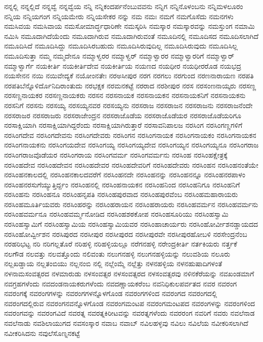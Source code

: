 {ನನ್ನಲ್ಲಿ
ನನ್ನಲ್ಲಿದೆ
ನನ್ನವ್ವೆ
ನನ್ನವ್ವೆಯ
ನನ್ನಿ
ನನ್ನಿಕಂದರ್ಪನೆಂಬುವವನು
ನನ್ನಿಗ
ನನ್ನಿನೊಳಂಬನು
ನನ್ನಿಮಳಲೂರಂ
ನನ್ನಿಯ
ನನ್ನಿಯಗಂಗ
ನನ್ನಿಯಮೇರು
ನನ್ನಿಯಸೇಕರ
ನನ್ನು
ನಮ
ನಮಃ
ನಮಗೆ
ನಮಗೊಸೆದು
ನಮನಗಳು
ನಮಸಿವಯ
ನಮಸಿವಾಯ
ನಮಸೋಮಾರ್ದ್ಧಧಾರಿಣೇ
ನಮಸ್ಕರಿಸಿ
ನಮಸ್ಕಾರ
ನಮಸ್ಕಾರವನ್ನು
ನಮಸ್ತುಂಗ
ನಮಾಮಿ
ನಮಿಸಿ
ನಮೂದಾಗಿದೆಯೆಂದು
ನಮೂದಾಗಿರುವ
ನಮೂದಾಗಿರುವಂತೆ
ನಮೂದಿನಲ್ಲಿ
ನಮೂದಿಸದ
ನಮೂದಿಸಲಾಗಿದೆ
ನಮೂದಿಸಿದೆ
ನಮೂದಿಸಿದ್ದು
ನಮೂದಿಸಿರಬಹುದು
ನಮೂದಿಸಿರುವುದಿಲ್ಲ
ನಮೂದಿಸಿರುವುದು
ನಮೂದಿಸಿಲ್ಲ
ನಮೂದಿಸುತ್ತಾ
ನಮ್ಮ
ನಮ್ಮದೇನೂ
ನಮ್ಮಾಳ್ವರರ
ನಮ್ಮಾಳ್ವರ್
ನಮ್ಮಾಳ್ವಾರರ
ನಮ್ಮಾಳ್ವಾರರಿಗೆ
ನಮ್ಮಾಳ್ವಾರ್
ನಮ್ಮಾಳ್ವಾರ್ಗೆ
ನಯಕೀರ್ತಿ
ನಯಕೀರ್ತಿದೇವ
ನಯಕೀರ್ತಿಯ
ನಯಣದ
ನಯಧೀರ
ನಯಧೀರರೊಡ
ನಯಭದ್ರ
ನಯಸೇನನ
ನಯಿ
ನಯಿವೇದ್ಯಕೆ
ನಯೋಂನತೇಃ
ನರಅಸೀಪುರ
ನರಗ
ನರಗಲು
ನರಗುಂದ
ನರಣನಾರಾಯಣ
ನರಪತಿ
ನರಪತಿಬೆನ್ನೊಳಿರ್ದೊನಿದಿರಾಂತುದು
ನರಭಕ್ಷಕ
ನರಮನಕಟ್ಟೆ
ನರರಾದ
ನರಶೀಪುರ
ನರಸ
ನರಸಂಣನಾಯ್ಕರು
ನರಸಣ್ಣ
ನರಸಣ್ಣನಾಯಕರ
ನರಸಣ್ಣನಾಯಕರು
ನರಸನ
ನರಸನಾಯಕ
ನರಸನಾಯಕನ
ನರಸನಾಯಕನಿಗೆ
ನರಸನಾಯಕನು
ನರಸನಿಗೆ
ನರಸನು
ನರಸಯ್ಯ
ನರಸಯ್ಯನವರ
ನರಸಯ್ಯನು
ನರಸರಾಜ
ನರಸರಾಜನ
ನರಸರಾಜನು
ನರಸರಾಜನೆಂದೇ
ನರಸರಾಜರ
ನರಸರಾಜರು
ನರಸರಾಜೇಂದ್ರನ
ನರಸರಾಜೊಡೆಯ
ನರಸರಾಜೊಡೆಯರ
ನರಸರಾಜೊಡೆಯರಿಗೂ
ನರಸಾಕ್ಷಿಯಾಗಿ
ನರಸಾಕ್ಷಿಯಾಗಿದ್ದರೆಂದು
ನರಸಾಕ್ಷಿಯಾಗಿರುತ್ತಾರೆ
ನರಸಾವನಿಪಾಲಜ
ನರಸಿಂಗ
ನರಸಿಂಗಣ್ಣಗಳಿಗೆ
ನರಸಿಂಗದೇವ
ನರಸಿಂಗದೇವನು
ನರಸಿಂಗದೇವರು
ನರಸಿಂಗನ
ನರಸಿಂಗನಾಯಕ
ನರಸಿಂಗನಾಯಕಂ
ನರಸಿಂಗನಾಯಕನ
ನರಸಿಂಗನಾಯಕನು
ನರಸಿಂಗಯದೇವ
ನರಸಿಂಗಯ್ಯ
ನರಸಿಂಗಯ್ಯದೇವ
ನರಸಿಂಗಯ್ಯನ
ನರಸಿಂಗಯ್ಯನೂ
ನರಸಿಂಗರಾಜ
ನರಸಿಂಗರಾಜವೊಡೆಯರ
ನರಸಿಂಗರಾಯ
ನರಸಿಂಗವರ್ಮ
ನರಸಿಂಗವರ್ಮನು
ನರಸಿಂಹ
ನರಸಿಂಹಕ್ಷೇತ್ರಕ್ಕೆ
ನರಸಿಂಹದೇವ
ನರಸಿಂಹದೇವನ
ನರಸಿಂಹದೇವರ
ನರಸಿಂಹದೇವರಿಗೆ
ನರಸಿಂಹದೇವರು
ನರಸಿಂಹನ
ನರಸಿಂಹನಂತೆಯೇ
ನರಸಿಂಹನಕಾಲದಲ್ಲಿ
ನರಸಿಂಹನಕಾಲದವರೆಗೆ
ನರಸಿಂಹನದೇ
ನರಸಿಂಹನನ್ನು
ನರಸಿಂಹನನ್ನೂ
ನರಸಿಂಹನರಪಾಳಂ
ನರಸಿಂಹನರಸುಗೆಯ್ಯುತ್ತಿರ್ದ್ದಂ
ನರಸಿಂಹನಲ್ಲಿ
ನರಸಿಂಹನಾಯಕನ
ನರಸಿಂಹನಿಂದ
ನರಸಿಂಹನಿಗೂ
ನರಸಿಂಹನಿಗೆ
ನರಸಿಂಹನು
ನರಸಿಂಹನೂ
ನರಸಿಂಹನೃಪತಿ
ನರಸಿಂಹಪುರವಾದ
ನರಸಿಂಹಪುರವೆಂಬ
ನರಸಿಂಹಮಹಾರಾಯರು
ನರಸಿಂಹಮೂರ್ತಿಯವರು
ನರಸಿಂಹರನ್ನು
ನರಸಿಂಹರಾಯನ
ನರಸಿಂಹರಾಯರು
ನರಸಿಂಹವರ್ಮನ
ನರಸಿಂಹವರ್ಮನು
ನರಸಿಂಹವರ್ಮನೂ
ನರಸಿಂಹವರ್ಮ್ಮನೋಡಿದ
ನರಸಿಂಹಶಠಕೋಪ
ನರಸಿಂಹಸೂರಿಯು
ನರಸಿಂಹಸ್ವಾಮಿ
ನರಸಿಂಹಸ್ವಾಮಿಗೆ
ನರಸಿಂಹಸ್ವಾಮಿಯ
ನರಸಿಂಹಸ್ವಾಮಿಯವರ
ನರಸಿಂಹಾಚಾರ್ಯರು
ನರಸಿಂಹೋರ್ವೀಶನಡ್ಡಾಯದದ
ನರಸಿಂಹೋರ್ವ್ವೀಶನ
ನರಸಿಪುರದ
ನರಸೀಪುರ
ನರಸೀಪುರದ
ನರಸೀಪುರವೇ
ನರಸೀಪುರಹೋಬಳಿ
ನರಸೇಂದ್ರನೆಂಬ
ನರಹರಿಭಟ್ಟ
ನರಿ
ನರಿಗಲ್ಲತೊರೆ
ನರಿಹಳ್ಳಿ
ನರಿಹಳ್ಳಿಯಲ್ಲೂ
ನರೆಗನಹಳ್ಳಿ
ನರೇಂದ್ರಕೀರ್ತಿ
ನರ್ತಕಿಯರು
ನರ್ತ್ತಕೆ
ನಲಗೌಡ
ನಲವತ್ತು
ನಲವತ್ತೊಂದು
ನಲಿವಂತು
ನಲುಗನಹಳ್ಳಿ
ನಲುಗನಹಳ್ಳಿಯನ್ನು
ನಲುವಶಿಯ
ನಲೂರು
ನಲ್ಲಖಡ್ಡಾಯ
ನಲ್ಲತಂಬಿಯು
ನಲ್ಲನಂಬಿ
ನಲ್ಲಿ
ನಲ್ಲೆಂಮ್ಮೆ
ನಲ್ಲೆತ್ತು
ನಳನಹಳ್ಳಿಯ
ನಳನಹುಷಾದಿಗಳಂತೆ
ನಳನಾಮಸಂವತ್ಸರದ
ನಳಮಾರುಡು
ನಳಸಂವತ್ಸರ
ನಳಸಂವತ್ಸರದ
ನಳಸಂವತ್ಸರವು
ನಳಿನಕೆರೆಯನ್ನು
ನವಖಂಡಮಾಗೆ
ನವಗ್ರಹಗಳೆಂದು
ನವದಂಡನಾಯಕರುಗಳೆಂದು
ನವದಣ್ಣಾಯಕರೆಂಬ
ನವನಿಧಿಕುಲಪರ್ವತದ
ನವರ
ನವರಂಗ
ನವರಂಗಕ್ಕೆ
ನವರಂಗಗಳನ್ನು
ನವರಂಗಗಳನ್ನೊಳಗೊಂಡ
ನವರಂಗಗಳಿಂದ
ನವರಂಗದ
ನವರಂಗದಲ್ಲಿ
ನವರಂಗದಲ್ಲಿರುವ
ನವರಂಗನವನ್ನೊಳಗೊಂಡ
ನವರಂಗಮಂಟಪ
ನವರಂಗಮಂಟಪದ
ನವರಂಗಳನ್ನು
ನವರಂಗಳಿಂದ
ನವರಂಗವನ್ನು
ನವರಂಗವಿದೆ
ನವರತ್ನ
ನವರತ್ನಕಿರೀಟವನ್ನು
ನವರತ್ನಗಳೆಂದು
ನವರರಂಗ
ನವರಿಗೆ
ನವರು
ನವಲೆನಾಡ
ನವಲೆನಾಡು
ನವಶಿಲಾಯುಗದ
ನವಸಂಸ್ಕಾರ
ನವಾಬ
ನವಾಬ್
ನವಿಲಹಳ್ಳವು
ನವಿಲು
ನವಿಲೆಯ
ನವೀಕರಿಸಲಾಗಿದೆ
ನವೀಕರಿಸಿದನು
ನವುಲೆಸೊಣ್ನನಕಟ್ಟೆ
}
